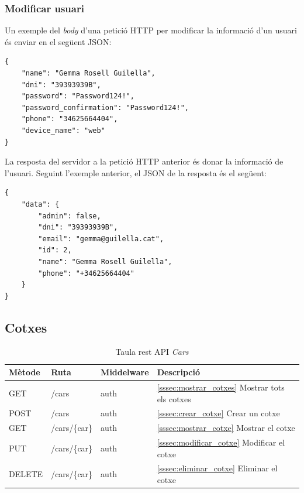 \subsubsection{Modificar usuari}
\label{sssec:modificar_usuari}

Un exemple del \emph{body} d'una petició HTTP per modificar la informació d'un usuari és enviar
en el següent JSON:
\begin{verbatim}
{
    "name": "Gemma Rosell Guilella",
    "dni": "39393939B",
    "password": "Password124!",
    "password_confirmation": "Password124!",
    "phone": "34625664404",
    "device_name": "web"
}
\end{verbatim}

La resposta del servidor a la petició HTTP anterior és donar la informació de l'usuari.
Seguint l'exemple anterior, el JSON de la resposta és el següent:
\begin{verbatim}
{
    "data": {
        "admin": false,
        "dni": "39393939B",
        "email": "gemma@guilella.cat",
        "id": 2,
        "name": "Gemma Rosell Guilella",
        "phone": "+34625664404"
    }
}
\end{verbatim}

\subsection{Cotxes}

\begin{table}[H]
\centering
\begin{tabular}{llll}
\hline
\textbf{Mètode} & \textbf{Ruta} & \textbf{Middelware} & \textbf{Descripció} \\ \hline
GET             & /cars       & auth &  \autoref{sssec:mostrar_cotxes}{ Mostrar tots els cotxes}     \\ \hline
POST            & /cars        & auth &  \autoref{sssec:crear_cotxe}{ Crear un cotxe}     \\ \hline
GET             & /cars/\{car\}  & auth &  \autoref{sssec:mostrar_cotxe}{ Mostrar el cotxe}     \\ \hline
PUT             & /cars/\{car\}  & auth &  \autoref{sssec:modificar_cotxe}{ Modificar el cotxe}     \\ \hline
DELETE          & /cars/\{car\}  & auth &  \autoref{sssec:eliminar_cotxe}{ Eliminar el cotxe}     \\ \hline
\end{tabular}
\caption{Taula rest API \emph{Cars}}
\label{tab:my-cars-api-table}
\end{table}

